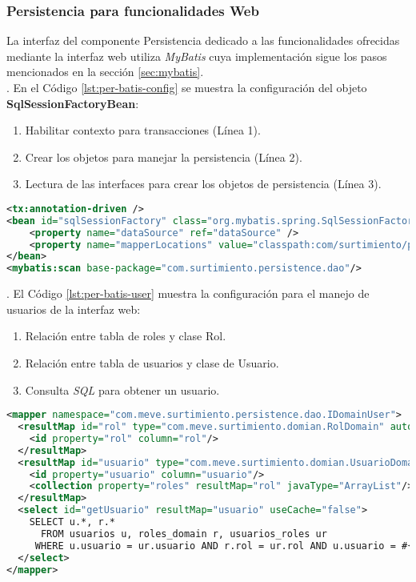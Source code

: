 \subsubsection{Persistencia para funcionalidades Web}\label{sec:persistence-web}
La interfaz del componente Persistencia dedicado a las funcionalidades ofrecidas mediante la interfaz web utiliza \textit{MyBatis} cuya implementación sigue los pasos mencionados en la sección \ref{sec:mybatis}.\\
. En el Código \ref{lst:per-batis-config} se muestra la configuración del objeto \textbf{SqlSessionFactoryBean}: 
\begin{enumerate}
	\item Habilitar contexto para transacciones (Línea 1).
	\item Crear los objetos para manejar la persistencia (Línea 2).
	\item Lectura de las interfaces para crear los objetos de persistencia (Línea 3).
\end{enumerate}
\begin{lstlisting}[language=XML, caption={Configuración de \textit{MyBatis} con \textit{Spring}.}, captionpos=b, label={lst:per-batis-config}]
<tx:annotation-driven />
<bean id="sqlSessionFactory" class="org.mybatis.spring.SqlSessionFactoryBean">
	<property name="dataSource" ref="dataSource" />
	<property name="mapperLocations" value="classpath:com/surtimiento/persistence/dao/*.xml" />
</bean>
<mybatis:scan base-package="com.surtimiento.persistence.dao"/>
\end{lstlisting}

. El Código \ref{lst:per-batis-user} muestra la configuración para el manejo de usuarios de la interfaz web:
\begin{enumerate}
	\item Relación entre tabla de roles y clase Rol.
	\item Relación entre tabla de usuarios y clase de Usuario.
	\item Consulta \textit{SQL} para obtener un usuario.
\end{enumerate}
\begin{lstlisting}[language=XML, caption={Definición de relación de \textit{MyBatis}.}, label={
lst:per-batis-user}]
<mapper namespace="com.meve.surtimiento.persistence.dao.IDomainUser">
  <resultMap id="rol" type="com.meve.surtimiento.domian.RolDomain" autoMapping="true">
    <id property="rol" column="rol"/>
  </resultMap>
  <resultMap id="usuario" type="com.meve.surtimiento.domian.UsuarioDomain" autoMapping="true">
    <id property="usuario" column="usuario"/>
    <collection property="roles" resultMap="rol" javaType="ArrayList"/>
  </resultMap>
  <select id="getUsuario" resultMap="usuario" useCache="false">
    SELECT u.*, r.*
      FROM usuarios u, roles_domain r, usuarios_roles ur
     WHERE u.usuario = ur.usuario AND r.rol = ur.rol AND u.usuario = #{0};
  </select>
</mapper>
\end{lstlisting}

